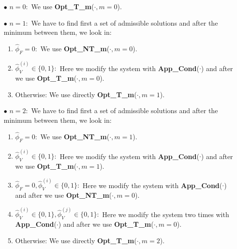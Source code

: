 \documentclass[12pt]{article}
\theoremstyle{definition}
\theoremstyle{remark}
\begin{document}
\begin{enumerate}

\item[$\bullet$] $n=0:$ We use \textbf{Opt\_T\_m}($\cdot,m=0$).

\item[$\bullet$] $n=1:$ We have to find first a set of admissible solutions and after the minimum between them, we look in:
\begin{enumerate}
\item $\hat{\phi}_F=0:$ We use \textbf{Opt\_NT\_m}($\cdot,m=0$).
\item $\hat{\phi}_V^{(i)}\in\{0,1\}:$ Here we modify the system with \textbf{App\_Cond}($\cdot$) and after we use \textbf{Opt\_T\_m}($\cdot,m=0$).
\item Otherwise: We use directly \textbf{Opt\_T\_m}($\cdot,m=1$).
\end{enumerate}

\item[$\bullet$] $n=2:$ We have to find first a set of admissible solutions and after the minimum between them, we look in:
\begin{enumerate}
\item $\hat{\phi}_F=0:$ We use \textbf{Opt\_NT\_m}($\cdot,m=1$).
\item $\hat{\phi}_V^{(i)}\in\{0,1\}:$ Here we modify the system with \textbf{App\_Cond}($\cdot$) and after we use \textbf{Opt\_T\_m}($\cdot,m=1$).
\item $\hat{\phi}_F=0,\hat{\phi}_V^{(i)}\in\{0,1\}:$ Here we modify the system with \textbf{App\_Cond}($\cdot$) and after we use \textbf{Opt\_NT\_m}($\cdot,m=0$).
\item $\hat{\phi}_V^{(i)}\in\{0,1\},\hat{\phi}_V^{(j)}\in\{0,1\}:$ Here we modify the system two times with \textbf{App\_Cond}($\cdot$) and after we use \textbf{Opt\_T\_m}($\cdot,m=0$).
\item Otherwise: We use directly \textbf{Opt\_T\_m}($\cdot,m=2$).
\end{enumerate}


\end{enumerate}
\end{document}
